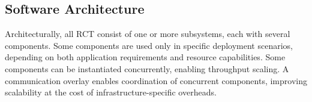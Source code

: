 \documentclass[preprint,12pt, a4paper]{elsarticle}
\begin{document}

\subsection{Software Architecture}\label{ssec:architecture}


Architecturally, all RCT consist of one or more subsystems, each with several
components. Some components are used only in specific deployment scenarios,
depending on both application requirements and resource capabilities. Some
components can be instantiated concurrently, enabling throughput scaling. A
communication overlay enables coordination of concurrent components, improving
scalability at the cost of infrastructure-specific overheads.


\end{document}

